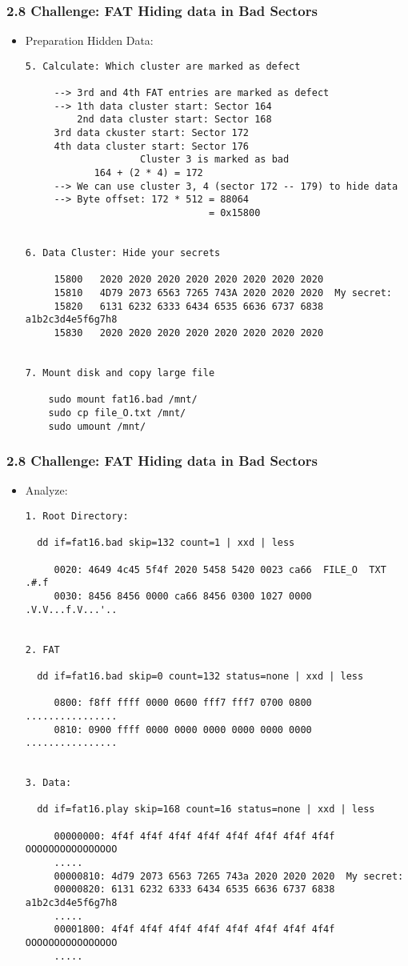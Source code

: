 \begin{frame}[fragile]
  \frametitle{2.8 Challenge: FAT Hiding data in Bad Sectors}
    \begin{itemize}
	    \item[] Preparation Hidden Data:
  \begin{lstlisting}[basicstyle=\tiny]
5. Calculate: Which cluster are marked as defect

     --> 3rd and 4th FAT entries are marked as defect
     --> 1th data cluster start: Sector 164
         2nd data cluster start: Sector 168
	 3rd data ckuster start: Sector 172
	 4th data cluster start: Sector 176
                    Cluster 3 is marked as bad
		    164 + (2 * 4) = 172
     --> We can use cluster 3, 4 (sector 172 -- 179) to hide data
     --> Byte offset: 172 * 512 = 88064
                                = 0x15800
                    

6. Data Cluster: Hide your secrets

     15800   2020 2020 2020 2020 2020 2020 2020 2020                  
     15810   4D79 2073 6563 7265 743A 2020 2020 2020  My secret:      
     15820   6131 6232 6333 6434 6535 6636 6737 6838  a1b2c3d4e5f6g7h8
     15830   2020 2020 2020 2020 2020 2020 2020 2020                  


7. Mount disk and copy large file

    sudo mount fat16.bad /mnt/
    sudo cp file_O.txt /mnt/
    sudo umount /mnt/
\end{lstlisting}
    \end{itemize}
\end{frame}


\begin{frame}[fragile]
  \frametitle{2.8 Challenge: FAT Hiding data in Bad Sectors}
    \begin{itemize}
	    \item[] Analyze:
  \begin{lstlisting}[basicstyle=\tiny]
1. Root Directory:

  dd if=fat16.bad skip=132 count=1 | xxd | less

     0020: 4649 4c45 5f4f 2020 5458 5420 0023 ca66  FILE_O  TXT .#.f
     0030: 8456 8456 0000 ca66 8456 0300 1027 0000  .V.V...f.V...'..


2. FAT

  dd if=fat16.bad skip=0 count=132 status=none | xxd | less

     0800: f8ff ffff 0000 0600 fff7 fff7 0700 0800  ................
     0810: 0900 ffff 0000 0000 0000 0000 0000 0000  ................


3. Data: 

  dd if=fat16.play skip=168 count=16 status=none | xxd | less

     00000000: 4f4f 4f4f 4f4f 4f4f 4f4f 4f4f 4f4f 4f4f  OOOOOOOOOOOOOOOO
     .....
     00000810: 4d79 2073 6563 7265 743a 2020 2020 2020  My secret:
     00000820: 6131 6232 6333 6434 6535 6636 6737 6838  a1b2c3d4e5f6g7h8
     .....
     00001800: 4f4f 4f4f 4f4f 4f4f 4f4f 4f4f 4f4f 4f4f  OOOOOOOOOOOOOOOO
     .....
\end{lstlisting}
    \end{itemize}
\end{frame}


